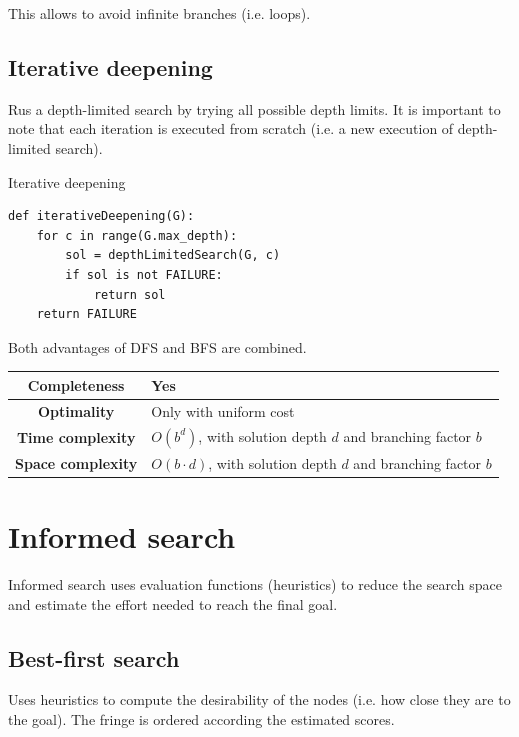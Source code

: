 This allows to avoid infinite branches (i.e. loops).



\subsection{Iterative deepening}
Rus a depth-limited search by trying all possible depth limits.
It is important to note that each iteration is executed from scratch (i.e. a new execution of depth-limited search).

\begin{algorithm}
\caption{Iterative deepening}
\begin{lstlisting}
def iterativeDeepening(G):
    for c in range(G.max_depth):
        sol = depthLimitedSearch(G, c)
        if sol is not FAILURE:
            return sol
    return FAILURE
\end{lstlisting}
\end{algorithm}

Both advantages of DFS and BFS are combined.

\begin{center}
    \def\arraystretch{1.2}
    \begin{tabular}{c | m{10cm}}
        \hline
        \textbf{Completeness} & Yes \\
        \hline
        \textbf{Optimality} & Only with uniform cost \\
        \hline
        \textbf{Time complexity}
            & $O(b^d)$, with solution depth $d$ and branching factor $b$ \\
        \hline
        \textbf{Space complexity}
            & $O(b \cdot d)$, with solution depth $d$ and branching factor $b$ \\
        \hline
    \end{tabular}
\end{center}



\section{Informed search}
Informed search uses evaluation functions (heuristics) to reduce the search space and
estimate the effort needed to reach the final goal.


\subsection{Best-first search}
Uses heuristics to compute the desirability of the nodes (i.e. how close they are to the goal).
The fringe is ordered according the estimated scores.


